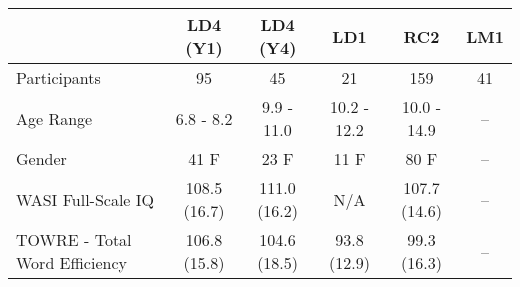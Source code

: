 \begin{tabular}{lccccc}
\toprule 
 & LD4 (Y1) & LD4 (Y4) & LD1 &  RC2 & LM1  \\ 
\midrule 
Participants & 95 & 45 & 21 &  159  &  41  \\
Age Range & 6.8 - 8.2 & 9.9 - 11.0 & 10.2 - 12.2 & 10.0 - 14.9 &  --   \\
Gender  & 41 F & 23 F & 11 F & 80 F &  --  \\ 
WASI Full-Scale IQ & 108.5 (16.7)  & 111.0 (16.2) & N/A & 107.7 (14.6)  &  --   \\ 
TOWRE - Total Word Efficiency & 106.8 (15.8) & 104.6 (18.5) & 93.8 (12.9) & 99.3 (16.3)  &  --  \\ 
\bottomrule 
\end{tabular}